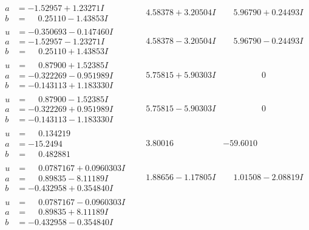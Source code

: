 \documentclass[1p]{elsarticle_modified}
\theoremstyle{definition}
\begin{document}
$$\begin{array}{c|c|c}
\begin{aligned}
a &= -1.52957 + 1.23271 I \\
b &= \phantom{-}0.25110 - 1.43853 I\end{aligned}
 & \phantom{-}4.58378 + 3.20504 I & \phantom{-}5.96790 + 0.24493 I \\ \hline\begin{aligned}
u &= -0.350693 - 0.147460 I \\
a &= -1.52957 - 1.23271 I \\
b &= \phantom{-}0.25110 + 1.43853 I\end{aligned}
 & \phantom{-}4.58378 - 3.20504 I & \phantom{-}5.96790 - 0.24493 I \\ \hline\begin{aligned}
u &= \phantom{-}0.87900 + 1.52385 I \\
a &= -0.322269 - 0.951989 I \\
b &= -0.143113 + 1.183330 I\end{aligned}
 & \phantom{-}5.75815 + 5.90303 I & \phantom{-0.000000 } 0 \\ \hline\begin{aligned}
u &= \phantom{-}0.87900 - 1.52385 I \\
a &= -0.322269 + 0.951989 I \\
b &= -0.143113 - 1.183330 I\end{aligned}
 & \phantom{-}5.75815 - 5.90303 I & \phantom{-0.000000 } 0 \\ \hline\begin{aligned}
u &= \phantom{-}0.134219\phantom{ +0.000000I} \\
a &= -15.2494\phantom{ +0.000000I} \\
b &= \phantom{-}0.482881\phantom{ +0.000000I}\end{aligned}
 & \phantom{-}3.80016\phantom{ +0.000000I} & -59.6010\phantom{ +0.000000I} \\ \hline\begin{aligned}
u &= \phantom{-}0.0787167 + 0.0960303 I \\
a &= \phantom{-}0.89835 - 8.11189 I \\
b &= -0.432958 + 0.354840 I\end{aligned}
 & \phantom{-}1.88656 - 1.17805 I & \phantom{-}1.01508 - 2.08819 I \\ \hline\begin{aligned}
u &= \phantom{-}0.0787167 - 0.0960303 I \\
a &= \phantom{-}0.89835 + 8.11189 I \\
b &= -0.432958 - 0.354840 I\end{aligned}

\end{array}$$
\end{document}
